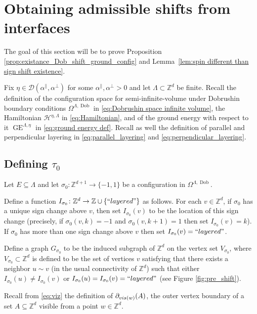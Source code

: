 \documentclass[11pt, reqno]{amsart}
\newcommand{\Z}{\mathbb{Z}}
\DeclareMathOperator{\Dob}{Dob}
\DeclareMathOperator{\GE}{GE}
\numberwithin{equation}{section}
\begin{document}
\section{Obtaining admissible shifts from interfaces}
\label{sec:obtaining admissible shifts}

The goal of this section will be to prove Proposition \ref{prop:existance_Dob_shift_ground_config}
and Lemma~\ref{lem:spin different than sign shift existence}. 

\medskip

Fix $\eta\in\mathcal{D}(\alpha^{\parallel},
\alpha^{\perp})$ for some  $\alpha^{\parallel},\alpha^{\perp}>0$
and let $\Lambda \subset \Z^d$ be finite.
Recall the definition of the configuration space for semi-infinite-volume under Dobrushin boundary conditions $\Omega^{\Lambda,\Dob}$ in \eqref{eq:Dobrushin space infinite volume}, the
Hamiltonian $\mathcal{H}^{\eta,\Lambda}$ in \eqref{eq:Hamiltonian}, and of the ground energy with respect to it $\GE^{\Lambda,\eta}$ in \eqref{eq:ground energy def}. Recall as well the definition of parallel and perpendicular layering in \eqref{eq:parallel_layering} and \eqref{eq:perpendicular_layering}.

\subsection{Defining ${\tau}_0$}
\label{sec:s_0}

Let $E\subseteq\Lambda$ and let $\sigma_0\colon {\mathbb Z}^{d+1} \to \{-1,1\}$ be a configuration in $\Omega^{\Lambda, \Dob}$.

Define a function $I_{\sigma_0}\colon \Z^d \to\Z \cup \{{\rm ``layered"}\}$ as follows. For each $v\in \Z^{d}$, if $\sigma_0$ has a unique sign change above $v$, then set $I_{\sigma_0}(v)$ to be the location of this sign change (precisely, if $\sigma_0(v,k)=-1$ and $\sigma_0(v,k+1)=1$ then set $I_{\sigma_0}(v) = k$). If $\sigma_0$ has more than one sign change above $v$ then set $I_{\sigma_0}(v) = {\rm ``layered"}$.

Define a graph $G_{\sigma_0}$ to be the induced subgraph of $\Z^d$ on the vertex set $V_{\sigma_0}$, where $V_{\sigma_0}\subset \Z^d$  is defined to be the set of vertices $v$ satisfying that there exists a neighbor $u\sim v$ (in the usual connectivity of $\Z^d$) such that either $I_{\sigma_0}(u) \neq I_{\sigma_0}(v)$ or $I_{\sigma_0}(u)=I_{\sigma_0}(v)={\rm ``layered"}$ (see Figure \ref{fig:pre_shift}).

Recall from \eqref{eq:viz} the definition of $\partial_{{\rm vis}(w)}(A)$, the outer vertex boundary of a set $A\subseteq{\mathbb Z}^d$ visible from a point $w\in{\mathbb Z}^d$. 
\end{document}

